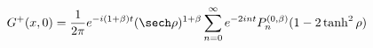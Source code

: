 \begin{equation}
\label{mode}
G^+(x,0)=\frac{1}{2\pi} e^{-i(1+\beta)t}(\sech\rho)^{1+\beta}
\sum_{n=0}^{\infty} e^{-2int} P_n^{(0,\beta)}(1-2\tanh^2\rho)
\end{equation}

